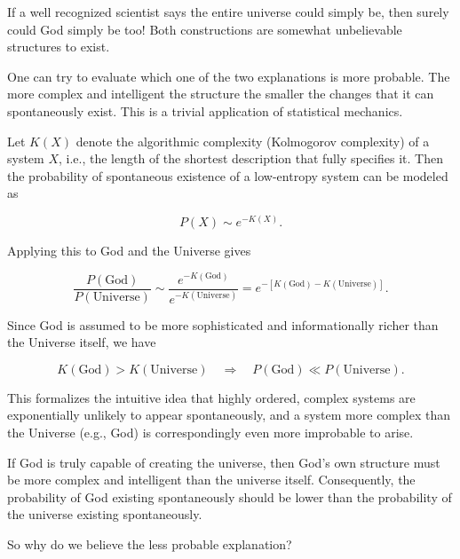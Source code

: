 If a well recognized scientist says the entire universe 
could simply be, then surely could God simply be too! Both constructions 
are somewhat unbelievable structures to exist.

One can try to evaluate which one of the two explanations is more probable.
The more complex and intelligent the structure the smaller the changes
that it can spontaneously exist. This is a trivial application of statistical mechanics.

Let \(K(X)\) denote the algorithmic complexity (Kolmogorov complexity) of a system \(X\), i.e.,
the length of the shortest description that fully specifies it. Then the probability of spontaneous
existence of a low-entropy system can be modeled as

\[
P(X) \sim e^{-K(X)}.
\]

Applying this to God and the Universe gives

\[
\frac{P(\text{God})}{P(\text{Universe})} \sim 
\frac{e^{-K(\text{God})}}{e^{-K(\text{Universe})}} 
= e^{-[K(\text{God}) - K(\text{Universe})]}.
\]

Since God is assumed to be more sophisticated and informationally richer than the Universe itself, we have

\[
K(\text{God}) > K(\text{Universe}) \quad \Rightarrow \quad P(\text{God}) \ll P(\text{Universe}).
\]

This formalizes the intuitive idea that highly ordered, complex systems are exponentially unlikely to appear spontaneously, and a system more complex than the Universe (e.g., God) is correspondingly even more improbable to arise.

If God is truly capable of creating the universe, then God’s own structure must be more complex and intelligent than the universe itself. Consequently, the probability of God existing spontaneously should be lower than the probability of the universe existing spontaneously.

So why do we believe the less probable explanation?

